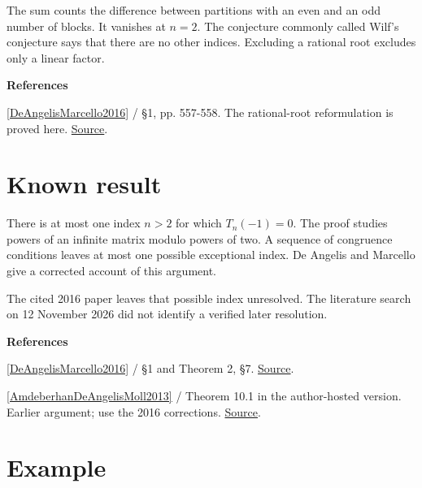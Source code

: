 \documentclass[11pt,a4paper,oneside,openany]{book}
\newcommand{\atlasdisplay}[1]{\par\begingroup\centering\vspace{3pt}\noindent\adjustbox{max width=\linewidth}{\(\displaystyle #1\)}\par\vspace{5pt}\endgroup}
\newenvironment{sources}{\par\smallskip\begingroup\footnotesize\color{atlasgray}\leftskip=10pt\setlength{\parskip}{2pt}}{\par\endgroup\smallskip}
\begin{document}
\atlasdisplay{T_n(-1)=\sum_{k=0}^n(-1)^kS(n,k)=0.}
\color{black} The sum counts the difference between partitions with an even and an odd number of blocks. It vanishes at \(n=2\). The conjecture commonly called Wilf's conjecture says that there are no other indices. Excluding a rational root excludes only a linear factor.\par
\begin{sources}
\textbf{References}\par\smallskip
\noindent\hyperlink{ref:DeAngelisMarcello2016}{[DeAngelisMarcello2016]} / §1, pp. 557-558. The rational-root reformulation is proved here. \href{https://doi.org/10.4169/amer.math.monthly.123.6.557}{Source}.\par
\end{sources}\color{black}
\section{Known result}
\color{black} There is at most one index \(n>2\) for which \(T_n(-1)=0\). The proof studies powers of an infinite matrix modulo powers of two. A sequence of congruence conditions leaves at most one possible exceptional index. De Angelis and Marcello give a corrected account of this argument.\par
\color{black} The cited 2016 paper leaves that possible index unresolved. The literature search on 12 November 2026 did not identify a verified later resolution.\par
\begin{sources}
\textbf{References}\par\smallskip
\noindent\hyperlink{ref:DeAngelisMarcello2016}{[DeAngelisMarcello2016]} / §1 and Theorem 2, §7.  \href{https://doi.org/10.4169/amer.math.monthly.123.6.557}{Source}.\par
\noindent\hyperlink{ref:AmdeberhanDeAngelisMoll2013}{[AmdeberhanDeAngelisMoll2013]} / Theorem 10.1 in the author-hosted version. Earlier argument; use the 2016 corrections. \href{https://doi.org/10.1007/978-3-642-30979-3_2}{Source}.\par
\end{sources}\color{black}
\section{Example}
\end{document}
